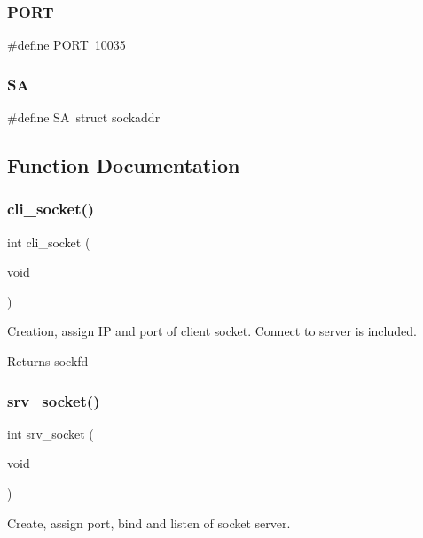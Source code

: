 \subsubsection{P\+O\+RT}
{\footnotesize\ttfamily \#define P\+O\+RT~10035}

\mbox{\label{socket_8h_a1e43924adac4ae865aa0acf79710261c}} 
\subsubsection{SA}
{\footnotesize\ttfamily \#define SA~struct   sockaddr}



\subsection{Function Documentation}
\mbox{\label{socket_8h_a5c5da4ed280f280eb2984b4b4191203e}} 
\subsubsection{cli\+\_\+socket()}
{\footnotesize\ttfamily int cli\+\_\+socket (\begin{DoxyParamCaption}\item[{void}]{ }\end{DoxyParamCaption})}



Creation, assign IP and port of client socket. Connect to server is included. 

\begin{DoxyReturn}{Returns}
sockfd 
\end{DoxyReturn}
\mbox{\label{socket_8h_a904ce9e03065ab436ce8c5d97c557c5c}} 
\subsubsection{srv\+\_\+socket()}
{\footnotesize\ttfamily int srv\+\_\+socket (\begin{DoxyParamCaption}\item[{void}]{ }\end{DoxyParamCaption})}



Create, assign port, bind and listen of socket server. 

